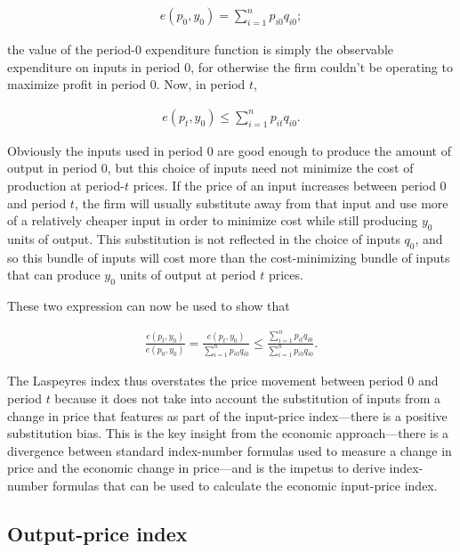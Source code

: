 \documentclass[]{article}
\begin{document}
\begin{align*}
e(p_{0}, y_{0}) = \sum_{i = 1}^{n} p_{i0} q_{i0};
\end{align*}

the value of the period-0 expenditure function is simply the observable expenditure on inputs in period 0, for otherwise the firm couldn't be operating to maximize profit in period 0. Now, in period \(t\),

\begin{align*}
e(p_{t}, y_{0}) \leq \sum_{i = 1}^{n} p_{it} q_{i0}.
\end{align*}

Obviously the inputs used in period 0 are good enough to produce the amount of output in period 0, but this choice of inputs need not minimize the cost of production at period-\(t\) prices. If the price of an input increases between period 0 and period \(t\), the firm will usually substitute away from that input and use more of a relatively cheaper input in order to minimize cost while still producing \(y_{0}\) units of output. This substitution is not reflected in the choice of inputs \(q_{0}\), and so this bundle of inputs will cost more than the cost-minimizing bundle of inputs that can produce \(y_{0}\) units of output at period \(t\) prices.

These two expression can now be used to show that

\begin{align*}
\frac{e(p_{t}, y_{0})}{e(p_{0}, y_{0})} = \frac{e(p_{t}, y_{0})}{\sum_{i = 1}^{n} p_{i0} q_{i0}} \leq \frac{\sum_{i = 1}^{n} p_{it} q_{i0}}{\sum_{i = 1}^{n} p_{i0} q_{i0}}.
\end{align*}

The Laspeyres index thus overstates the price movement between period 0 and period \(t\) because it does not take into account the substitution of inputs from a change in price that features as part of the input-price index---there is a positive substitution bias. This is the key insight from the economic approach---there is a divergence between standard index-number formulas used to measure a change in price and the economic change in price---and is the impetus to derive index-number formulas that can be used to calculate the economic input-price index.

\hypertarget{output-price-index}{%
\subsection{Output-price index}\label{output-price-index}}
\end{document}
